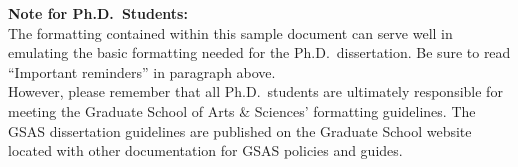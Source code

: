 \begin{extranotespage}
\begin{singlespace}
{ \textbf{Note for Ph.D.\ Students:}} \\
The formatting contained within this sample document can serve well in
emulating the basic formatting needed for the Ph.D.\ dissertation.  Be sure to
read ``Important reminders'' in paragraph above.\\ However, please remember
that all Ph.D.\ students are ultimately responsible for meeting the Graduate
School of Arts \& Sciences' formatting guidelines.  The GSAS dissertation
guidelines are published on the Graduate School website located with other
documentation for GSAS policies and guides.

\end{singlespace}
\fi
\end{extranotespage}

\iffalse
\begin{thesiscopyrightpage}                 %
\end{thesiscopyrightpage}
\fi


